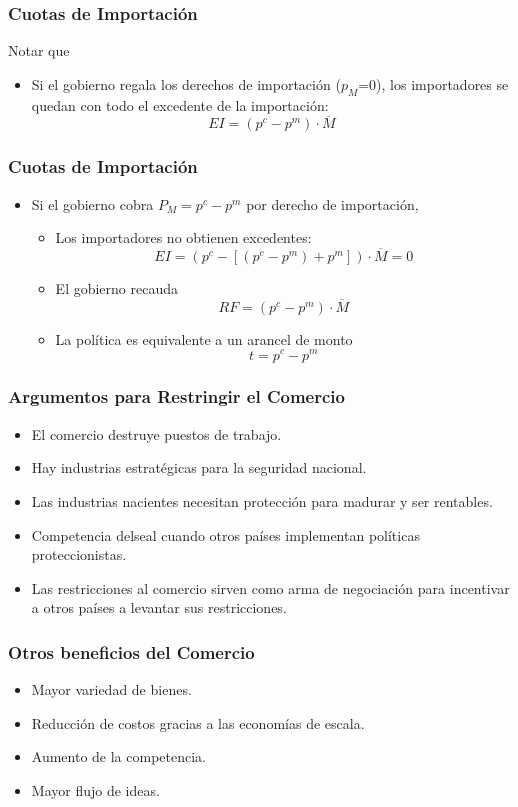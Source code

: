\documentclass[dvipsnames,table,leqno]{beamer}
\newcommand{\peq}[1]{{\scriptscriptstyle{#1}}}
\newcommand{\rp}[1]{\left(#1\right)}
\newcommand{\sqp}[1]{\left[#1\right]}
\begin{document}
		\begin{frame}
			\frametitle{Cuotas de Importación}
			Notar que
			\begin{itemize}
				\item Si el gobierno regala los derechos de importación ($p_\peq{M}$=0), los importadores se quedan con todo el excedente de la importación: $$EI=\rp{p^\peq{c}-p^\peq{m}}\cdot\overline{M}$$
			\end{itemize}
		\end{frame}

		\begin{frame}
			\frametitle{Cuotas de Importación}
			\begin{itemize}
				\item Si el gobierno cobra $P_\peq{M}=p^\peq{c}-p^\peq{m}$ por derecho de importación,
					\begin{itemize}
						\item Los importadores no obtienen excedentes: $$EI=\rp{p^\peq{c}-\sqp{\rp{p^\peq{c}-p^\peq{m}}+p^\peq{m}}}\cdot\overline{M}=0$$
						\item El gobierno recauda $$RF=\rp{p^\peq{c}-p^\peq{m}}\cdot\overline{M}$$
						\item La política es equivalente a un arancel de monto $$t=p^\peq{c}-p^\peq{m}$$
					\end{itemize}
			\end{itemize}
		\end{frame}

		\begin{frame}
			\frametitle{Argumentos para Restringir el Comercio}
			\begin{itemize}
				\item El comercio destruye puestos de trabajo.
				\item Hay industrias estratégicas para la seguridad nacional.
				\item Las industrias nacientes necesitan protección para madurar y ser rentables.
				\item Competencia delseal cuando otros países implementan políticas proteccionistas.
				\item Las restricciones al comercio sirven como arma de negociación para incentivar a otros países a levantar sus restricciones.
			\end{itemize}
		\end{frame}

		\begin{frame}
			\frametitle{Otros beneficios del Comercio}
			\begin{itemize}
				\item Mayor variedad de bienes.
				\item Reducción de costos gracias a las economías de escala.
				\item Aumento de la competencia.
				\item Mayor flujo de ideas.
			\end{itemize}
		\end{frame}
\end{document}
